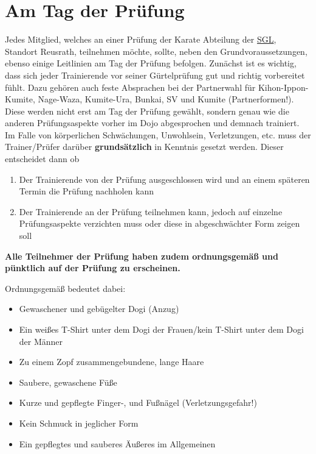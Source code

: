 	\vspace{12pt}
	\renewcommand{\labelenumi}{\alph{enumi}.)}
	\section{Am Tag der Prüfung}
		Jedes Mitglied, welches an einer Prüfung der Karate Abteilung der \href{https://www.sglangenfeld.de/}{SGL}, Standort Reusrath, teilnehmen möchte, sollte, neben den Grundvoraussetzungen, ebenso einige Leitlinien am Tag der Prüfung befolgen.\vspace{4pt}\newline
		Zunächst ist es wichtig, dass sich jeder Trainierende vor seiner Gürtelprüfung gut und richtig vorbereitet fühlt. Dazu gehören auch feste Absprachen bei der Partnerwahl für Kihon-Ippon-Kumite, Nage-Waza, Kumite-Ura, Bunkai, SV und Kumite (Partnerformen!). Diese werden nicht erst am Tag der Prüfung gewählt, sondern genau wie die anderen Prüfungsaspekte vorher im Dojo abgesprochen und demnach trainiert.\vspace{4pt}\newline
		Im Falle von körperlichen Schwächungen, Unwohlsein, Verletzungen, etc. muss der Trainer/Prüfer darüber \mbox{\textbf{grundsätzlich}} in Kenntnis gesetzt werden. Dieser entscheidet dann ob
		\begin{enumerate}[nosep]
			\item Der Trainierende von der Prüfung ausgeschlossen wird und an einem späteren Termin die Prüfung nachholen kann
			\item Der Trainierende an der Prüfung teilnehmen kann, jedoch auf einzelne Prüfungsaspekte verzichten muss oder diese in abgeschwächter Form zeigen soll
		\end{enumerate}
		\begin{center}
			\textbf{Alle Teilnehmer der Prüfung haben zudem ordnungsgemäß und pünktlich auf der Prüfung zu erscheinen.}
		\end{center}
		Ordnungsgemäß bedeutet dabei:
	\renewcommand{\labelenumi}{$\bullet$}
		\begin{itemize}[nosep]
			\item Gewaschener und gebügelter Dogi (Anzug)
			\item Ein weißes T-Shirt unter dem Dogi der Frauen/kein T-Shirt unter dem Dogi der Männer
			\item Zu einem Zopf zusammengebundene, lange Haare
			\item Saubere, gewaschene Füße
			\item Kurze und gepflegte Finger-, und Fußnägel (Verletzungsgefahr!)
			\item Kein Schmuck in jeglicher Form
			\item Ein gepflegtes und sauberes Äußeres im Allgemeinen
		\end{itemize}
